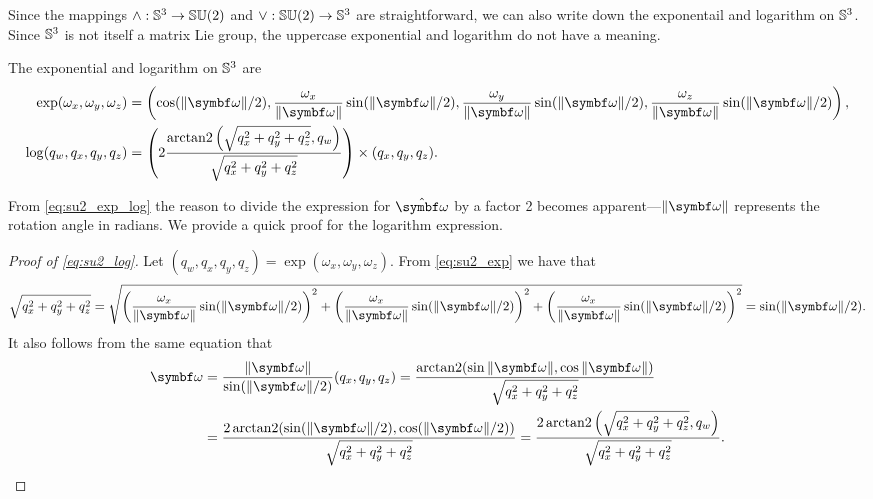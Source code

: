 Since the mappings $\wedge: {\mathbb{S}^3} \rightarrow {\mathbb{SU}(2)}$ and $\vee: {\mathbb{SU}(2)} \rightarrow {\mathbb{S}^3}$ are straightforward, we can also write down the exponentail and logarithm on ${\mathbb{S}^3}$. Since ${\mathbb{S}^3}$ is not itself a matrix Lie group, the uppercase exponential and logarithm do not have a meaning.
\begin{important}
  The exponential and logarithm on ${\mathbb{S}^3}$ are
  \begin{subequations}
    \label{eq:su2_exp_log}
    \begin{align}
      \label{eq:su2_exp}\exp (\omega_x, \omega_y, \omega_z) & = \left(
      \cos (\| \bomega \|/2), \frac{\omega_x}{\| \bomega \|} \sin (\| \bomega \|/2), \frac{\omega_y}{\| \bomega \|} \sin (\| \bomega \|/2), \frac{\omega_z}{\| \bomega \|} \sin ( \| \bomega \|/2 ) \right), \\
      \label{eq:su2_log} \log (q_w, q_x, q_y, q_z)          & = \left( 2 \frac{ \arctantwo \left(\sqrt{q_x^2 + q_y^2 + q_z^2}, q_w \right) }{ \sqrt{q_x^2 + q_y^2 + q_z^2} } \right) \times (q_x, q_y, q_z).
    \end{align}
  \end{subequations}
\end{important}
From \eqref{eq:su2_exp_log} the reason to divide the expression for $\hat \bomega$ by a factor 2  becomes apparent---$\| \bomega \|$ represents the rotation angle in radians. We provide a quick proof for the logarithm expression.
\begin{proof}[Proof of \eqref{eq:su2_log}]
  Let $(q_w, q_x, q_y, q_z) = \exp(\omega_x, \omega_y, \omega_z)$. From \eqref{eq:su2_exp} we have that
  \begin{equation}
    \sqrt{q_x^2 + q_y^2 + q_z^2} = \sqrt{ \left( \frac{\omega_x}{\| \bomega \| } \sin ( \| \bomega \| / 2) \right)^2 + \left( \frac{\omega_x}{\| \bomega \| } \sin ( \| \bomega \| / 2) \right)^2 + \left( \frac{\omega_x}{\| \bomega \| } \sin ( \| \bomega \| / 2) \right)^2 } = \sin (\| \bomega \| / 2).
  \end{equation}
  It also follows from the same equation that
  \begin{equation}
    \begin{aligned}
      \bomega & = \frac{\|\bomega\|}{\sin(\| \bomega \| / 2)}(q_x, q_y, q_z)
      = \frac{\arctantwo(\sin \| \bomega \| , \cos \| \bomega \| )}{\sqrt{q_x^2 + q_y^2 + q_z^2}}                       \\
              & = \frac{2 \arctantwo(\sin (\| \bomega \| / 2), \cos (\| \bomega \| / 2))}{\sqrt{q_x^2 + q_y^2 + q_z^2}}
      = \frac{2 \arctantwo\left( \sqrt{q_x^2 + q_y^2 + q_z^2}, q_w \right)}{\sqrt{q_x^2 + q_y^2 + q_z^2}}.
    \end{aligned}
  \end{equation}
\end{proof}


